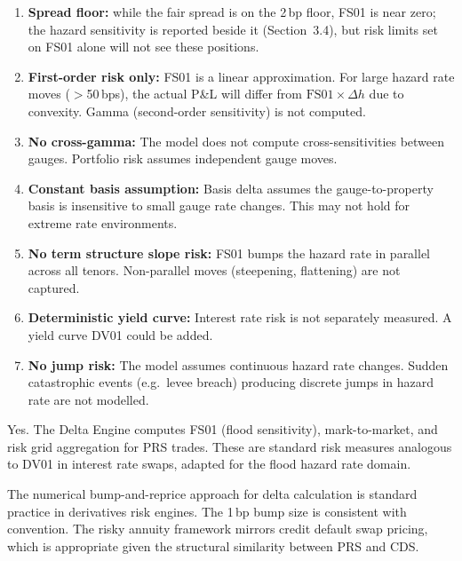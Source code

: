 \documentclass[11pt,a4paper]{article}
\begin{document}
\begin{enumerate}
    \item \textbf{Spread floor:} while the fair spread is on the 2\,bp floor, FS01 is near zero; the hazard sensitivity is reported beside it (Section~3.4), but risk limits set on FS01 alone will not see these positions.
    \item \textbf{First-order risk only:} FS01 is a linear approximation. For large hazard rate moves ($>$50\,bps), the actual P\&L will differ from $\text{FS01} \times \Delta h$ due to convexity. Gamma (second-order sensitivity) is not computed.
    \item \textbf{No cross-gamma:} The model does not compute cross-sensitivities between gauges. Portfolio risk assumes independent gauge moves.
    \item \textbf{Constant basis assumption:} Basis delta assumes the gauge-to-property basis is insensitive to small gauge rate changes. This may not hold for extreme rate environments.
    \item \textbf{No term structure slope risk:} FS01 bumps the hazard rate in parallel across all tenors. Non-parallel moves (steepening, flattening) are not captured.
    \item \textbf{Deterministic yield curve:} Interest rate risk is not separately measured. A yield curve DV01 could be added.
    \item \textbf{No jump risk:} The model assumes continuous hazard rate changes. Sudden catastrophic events (e.g.\ levee breach) producing discrete jumps in hazard rate are not modelled.
\end{enumerate}

\clearpage

\mkmgovernance


Yes. The Delta Engine computes FS01 (flood sensitivity), mark-to-market, and risk grid aggregation for PRS trades. These are standard risk measures analogous to DV01 in interest rate swaps, adapted for the flood hazard rate domain.


The numerical bump-and-reprice approach for delta calculation is standard practice in derivatives risk engines. The 1\,bp bump size is consistent with convention. The risky annuity framework mirrors credit default swap pricing, which is appropriate given the structural similarity between PRS and CDS.
\end{document}
